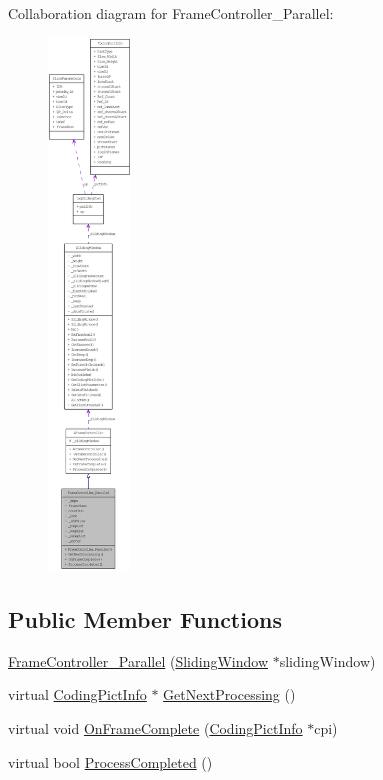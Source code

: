 Collaboration diagram for FrameController\_\-Parallel:\nopagebreak
\begin{figure}[H]
\begin{center}
\leavevmode
\includegraphics[height=400pt]{class_frame_controller___parallel__coll__graph}
\end{center}
\end{figure}
\subsection*{Public Member Functions}
\begin{DoxyCompactItemize}
\item 
\hyperlink{class_frame_controller___parallel_a5e258e822b7cea0eb61e02b28a7f0db7}{FrameController\_\-Parallel} (\hyperlink{class_sliding_window}{SlidingWindow} $\ast$slidingWindow)
\item 
virtual \hyperlink{struct_coding_pict_info}{CodingPictInfo} $\ast$ \hyperlink{class_frame_controller___parallel_a51792b5fe70db6d99be59c110dbc3041}{GetNextProcessing} ()
\item 
virtual void \hyperlink{class_frame_controller___parallel_a26429e70ddf3aa68cc2d28000a4935e1}{OnFrameComplete} (\hyperlink{struct_coding_pict_info}{CodingPictInfo} $\ast$cpi)
\item 
virtual bool \hyperlink{class_frame_controller___parallel_ac778eb523c6725a9e4da4e4239a88b2a}{ProcessCompleted} ()
\end{DoxyCompactItemize}



